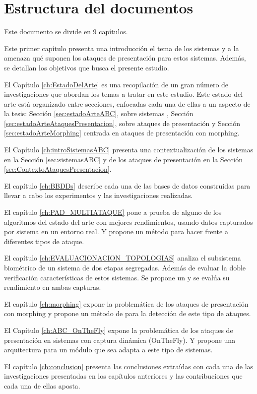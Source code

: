 \section{Estructura del documentos\label{ch:estructura}}

Este documento se divide en 9 capítulos.

Este primer capítulo presenta una introducción el tema de los sistemas  y a la amenaza qué suponen los ataques de presentación para estos sistemas. Además, se detallan los objetivos que busca el presente estudio.

El Capítulo \ref{ch:EstadoDelArte} es una recopilación de un gran número de investigaciones que abordan los temas a tratar en este estudio. Este estado del arte está organizado entre secciones, enfocadas cada una de ellas a un aspecto de la tesis: Sección \ref{sec:estadoArteABC}, sobre sistemas , Sección \ref{sec:estadoArteAtaquesPresentacion}, sobre ataques de presentación y Sección \ref{sec:estadoArteMorphing} centrada en ataques de presentación con \gls{morphing}.

El Capítulo \ref{ch:introSistemasABC} presenta una contextualización de los sistemas  en la Sección \ref{sec:sistemasABC} y de los ataques de presentación en la Sección \ref{sec:ContextoAtaquesPresentacion}.

El capítulo \ref{ch:BBDDs} describe cada una de las bases de datos construidas para llevar a cabo los experimentos y las investigaciones realizadas.

El capítulo \ref{ch:PAD_MULTIATAQUE} pone a prueba de alguno de los algoritmos del estado del arte con mejores rendimientos, usando datos capturados por sistema  en un entorno real. Y propone un método  para hacer frente a diferentes tipos de ataque.

El capítulo \ref{ch:EVALUACIONACION_TOPOLOGIAS} analiza el subsistema biométrico de un sistema  de dos etapas segregadas. Además de evaluar la doble verificación características de estos sistemas. Se propone un  y se evalúa su rendimiento en ambas capturas.

El capítulo \ref{ch:morphing} expone la problemática de los ataques de presentación con \gls{morphing} y propone un método de  para la detección de este tipo de ataques.

El Capítulo \ref{ch:ABC_OnTheFly} expone la problemática de los ataques de presentación en sistemas  con captura dinámica (\Gls{OnTheFly}). Y propone una arquitectura para un módulo  que sea adapta a este tipo de sistemas.

El capítulo \ref{ch:conclusion} presenta las conclusiones extraídas con cada una de las investigaciones presentadas en los capítulos anteriores y las contribuciones que cada una de ellas aposta.
